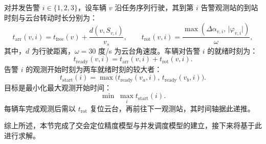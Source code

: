 对并发告警 $i\in\{1,2,3\}$，设车辆 $v$ 沿任务序列行驶，其到第 $i$ 告警观测站的到站时刻与云台转动时长分别为：
\begin{equation}
    t_{\text{arr}}(v,i)=t_{\text{free}}(v)+\frac{d(v,S_{v,i})}{v_s}, \qquad
    t_{\text{rot}}(v,i)=\frac{\max(\Delta\alpha_{v,i},\,\lvert\varphi_{v,i}\rvert)}{\omega},
\end{equation}
其中，$d$ 为行驶距离，$\omega=30$ 度/s 为云台角速度。车辆对告警 $i$ 的就绪时刻为：
\begin{equation}
    t_{\text{ready}}(v,i)=t_{\text{arr}}(v,i)+t_{\text{rot}}(v,i).
\end{equation}
告警 $i$ 的观测开始时刻为两车就绪时刻的较大者：
\begin{equation}
    t_{\text{start}}(i)=\max\big(t_{\text{ready}}(v_a,i),\,t_{\text{ready}}(v_b,i)\big).
\end{equation}
目标是最小化最大观测开始时间：
\begin{equation}
    \min \; \max_i t_{\text{start}}(i).
\end{equation}
每辆车完成观测后需以 $t_{\text{rot}}$ 复位云台，再前往下一观测站，其时间轴据此递推。

综上所述，本节完成了交会定位精度模型与并发调度模型的建立，接下来将基于此进行求解。
